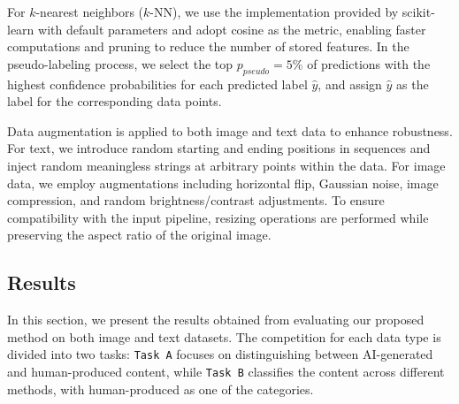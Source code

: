 For $k$-nearest neighbors ($k$-NN), we use the implementation provided by scikit-learn \cite{pedregosa2011scikit} with default parameters and adopt cosine as the metric, enabling faster computations and pruning to reduce the number of stored features. 
In the pseudo-labeling process, we select the top $p_{pseudo} = 5\%$ of predictions with the highest confidence probabilities for each predicted label $\hat{y}$, and assign $\hat{y}$ as the label for the corresponding data points.

Data augmentation is applied to both image and text data to enhance robustness. For text, we introduce random starting and ending positions in sequences and inject random meaningless strings at arbitrary points within the data. For image data, we employ augmentations including horizontal flip, Gaussian noise, image compression, and random brightness/contrast adjustments. To ensure compatibility with the input pipeline, resizing operations are performed while preserving the aspect ratio of the original image.


\subsection{Results}
\label{sec:results}
In this section, we present the results obtained from evaluating our proposed method on both image and text datasets. The competition for each data type is divided into two tasks: \texttt{Task A} focuses on distinguishing between AI-generated and human-produced content, while \texttt{Task B} classifies the content across different methods, with human-produced as one of the categories.

